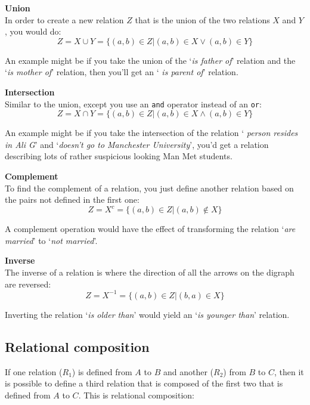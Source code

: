\begin{description}
	\item {\bf Union}\\
		In order to create a new relation $Z$ that is the union of the two
		relations $X$ and $Y$, you would do:
		\[
			Z = X \cup Y = \{(a,b) \in Z | (a,b) \in X \vee (a,b) \in Y\}
		\]

		An example might be if you take the union of the `{\it is father of}'
		relation and the `{\it is mother of}' relation, then you'll get an `{\it
		is parent of}' relation.

	\item {\bf Intersection}\\
		Similar to the union, except you use an {\tt and} operator instead of an
		{\tt or}:
		\[
			Z = X \cap Y = \{(a,b) \in Z | (a,b) \in X \wedge (a,b) \in Y\}
		\]

		An example might be if you take the intersection of the relation `{\it
		person resides in Ali G}' and `{\it doesn't go to Manchester
		University}', you'd get a relation describing lots of rather suspicious
		looking Man Met students.

	\item {\bf Complement}\\
		To find the complement of a relation, you just define another relation
		based on the pairs not defined in the first one:
		\[
			Z = X^c = \{(a,b) \in Z | (a,b) \not\in X\}
		\]

		A complement operation would have the effect of transforming the
		relation `{\it are married}' to `{\it not married}'.

	\item {\bf Inverse}\\
		The inverse of a relation is where the direction of all the arrows on
		the digraph are reversed:
		\[
			Z = X^{-1} = \{(a,b) \in Z | (b,a) \in X\}
		\]

		Inverting the relation `{\it is older than}' would yield an `{\it is
		younger than}' relation.

\end{description}

\subsection{Relational composition}

If one relation ($R_1$) is defined from $A$ to $B$ and another ($R_2$) from $B$
to $C$, then it is possible to define a third relation that is composed of the
first two that is defined from $A$ to $C$. This is relational composition:

